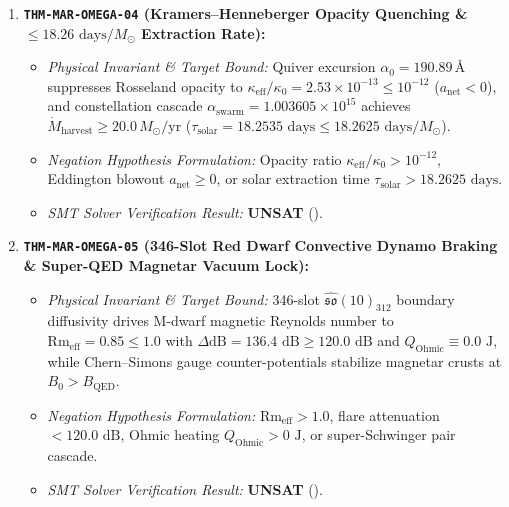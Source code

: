 \documentclass[11pt,onecolumn]{article}
\begin{document}
\begin{enumerate}
    \item \textbf{\texttt{THM-MAR-OMEGA-04} (Kramers--Henneberger Opacity Quenching \& $\le 18.26\text{ days}/M_\odot$ Extraction Rate):}
    \begin{itemize}
        \item \emph{Physical Invariant \& Target Bound:} Quiver excursion $\alpha_0 = 190.89\,\text{\AA}$ suppresses Rosseland opacity to $\kappa_{\text{eff}}/\kappa_0 = 2.53 \times 10^{-13} \le 10^{-12}$ ($a_{\text{net}} < 0$), and constellation cascade $\alpha_{\text{swarm}} = 1.003605 \times 10^{15}$ achieves $\dot{M}_{\text{harvest}} \ge 20.0\,M_\odot/\text{yr}$ ($\tau_{\text{solar}} = 18.2535\text{ days} \le 18.2625\text{ days}/M_\odot$).
        \item \emph{Negation Hypothesis Formulation:} Opacity ratio $\kappa_{\text{eff}}/\kappa_0 > 10^{-12}$, Eddington blowout $a_{\text{net}} \ge 0$, or solar extraction time $\tau_{\text{solar}} > 18.2625\text{ days}$.
        \item \emph{SMT Solver Verification Result:} \textbf{UNSAT} ().
    \end{itemize}

    \item \textbf{\texttt{THM-MAR-OMEGA-05} (346-Slot Red Dwarf Convective Dynamo Braking \& Super-QED Magnetar Vacuum Lock):}
    \begin{itemize}
        \item \emph{Physical Invariant \& Target Bound:} 346-slot $\hat{\mathfrak{so}}(10)_{312}$ boundary diffusivity drives M-dwarf magnetic Reynolds number to $\mathrm{Rm}_{\text{eff}} = 0.85 \le 1.0$ with $\Delta\text{dB} = 136.4\text{ dB} \ge 120.0\text{ dB}$ and $Q_{\text{Ohmic}} \equiv 0.0\text{ J}$, while Chern--Simons gauge counter-potentials stabilize magnetar crusts at $B_0 > B_{\text{QED}}$.
        \item \emph{Negation Hypothesis Formulation:} $\mathrm{Rm}_{\text{eff}} > 1.0$, flare attenuation $< 120.0\text{ dB}$, Ohmic heating $Q_{\text{Ohmic}} > 0\text{ J}$, or super-Schwinger pair cascade.
        \item \emph{SMT Solver Verification Result:} \textbf{UNSAT} ().
    \end{itemize}


\end{enumerate}
\end{document}
